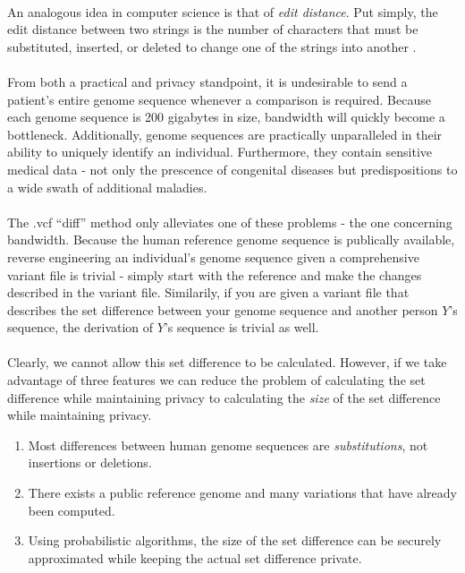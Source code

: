 \documentclass[12pt]{article}
\begin{document}
\paragraph{}
An analogous idea in computer science is that of \textit{edit distance}. Put simply, the edit distance between two strings is the number of characters that must be substituted, inserted, or deleted to change one of the strings into another \cite{editdistance}.

\paragraph{}
From both a practical and privacy standpoint, it is undesirable to send a patient's entire genome sequence whenever a comparison is required. Because each genome sequence is 200 gigabytes in size, bandwidth will quickly become a bottleneck. Additionally, genome sequences are practically unparalleled in their ability to uniquely identify an individual. Furthermore, they contain sensitive medical data - not only the prescence of congenital diseases but predispositions to a wide swath of additional maladies.

\paragraph{}
The .vcf ``diff'' method only alleviates one of these problems - the one concerning bandwidth. Because the human reference genome sequence is publically available, reverse engineering an individual's genome sequence given a comprehensive variant file is trivial - simply start with the reference and make the changes described in the variant file. Similarily, if you are given a variant file that describes the set difference between your genome sequence and another person $Y$'s sequence, the derivation of $Y$'s sequence is trivial as well. 

\paragraph{}
Clearly, we cannot allow this set difference to be calculated. However, if we take advantage of three features we can reduce the problem of calculating the set difference while maintaining privacy to calculating the \textit{size} of the set difference while maintaining privacy.

\begin{enumerate}
\item Most differences between human genome sequences are \textit{substitutions}, not insertions or deletions.
\item There exists a public reference genome and many variations that have already been computed.
\item Using probabilistic algorithms, the size of the set difference can be securely approximated while keeping the actual set difference private.
\end{enumerate}
\end{document}

